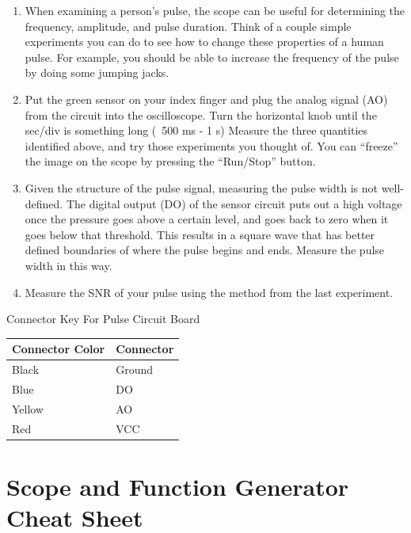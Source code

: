 \begin{enumerate}
\item When examining a person's pulse, the scope can be useful for determining the frequency, amplitude, and pulse duration. Think of a couple simple experiments you can do to see how to change these properties of a human pulse. For example, you should be able to increase the frequency of the pulse by doing some jumping jacks.

\item Put the green sensor on your index finger and plug the analog signal (AO) from the circuit into the oscilloscope. Turn the horizontal knob until the sec/div is something long (~500 ms - 1 s) Measure the three quantities identified above, and try those experiments you thought of. You can ``freeze'' the image on the scope by pressing the ``Run/Stop'' button.

\item Given the structure of the pulse signal, measuring the pulse width is not well-defined. The digital output (DO) of the sensor circuit puts out a high voltage once the pressure goes above a certain level, and goes back to zero when it goes below that threshold. This results in a square wave that has better defined boundaries of where the pulse begins and ends. Measure the pulse width in this way.

\item Measure the SNR of your pulse using the method from the last experiment.
\end{enumerate}

\begin{center}
Connector Key For Pulse Circuit Board\\
\begin{tabular}{ |l | l | } \hline
  \textbf{Connector Color} & \textbf{Connector} \\ \hline
  Black & Ground \\ \hline
  Blue & DO \\ \hline
  Yellow & AO \\ \hline
  Red & VCC \\ \hline
\end{tabular}
\end{center}


\newpage

\section*{Scope and Function Generator Cheat Sheet}

